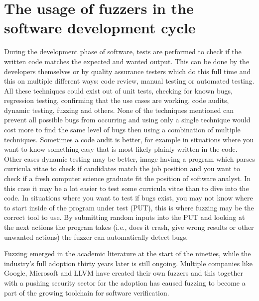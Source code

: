 \section{The usage of fuzzers in the software development cycle}
\label{intro:SoftwareDevelopmentCycle}
During the development phase of software, tests are performed to check if the written code matches the expected and wanted output. This can be done by the developers themselves or by quality assurance testers which do this full time and this on multiple different ways: code review, manual testing or automated testing. All these techniques could exist out of unit tests, checking for known bugs, regression testing, confirming that the use cases are working, code audits, dynamic testing, fuzzing and others. None of the techniques mentioned can prevent all possible bugs from occurring and using only a single technique would cost more to find the same level of bugs then using a combination of multiple techniques. Sometimes a code audit is better, for example in situations where you want to know something easy that is most likely plainly written in the code. Other cases dynamic testing may be better, image having a program which parses curricula vitae to check if candidates match the job position and you want to check if a fresh computer science graduate fit the position of software analyst. In this case it may be a lot easier to test some curricula vitae than to dive into the code. In situations where you want to test if bugs exist, you may not know where to start inside of the program under test (PUT), this is where fuzzing may be the correct tool to use. By submitting random inputs into the PUT and looking at the next actions the program takes (i.e., does it crash, give wrong results or other unwanted actions) the fuzzer can automatically detect bugs.

Fuzzing emerged in the academic literature at the start of the nineties, while the industry's full adoption thirty years later is still ongoing. Multiple companies like Google, Microsoft and LLVM have created their own fuzzers and this together with a pushing security sector for the adoption has caused fuzzing to become a part of the growing toolchain for software verification.


